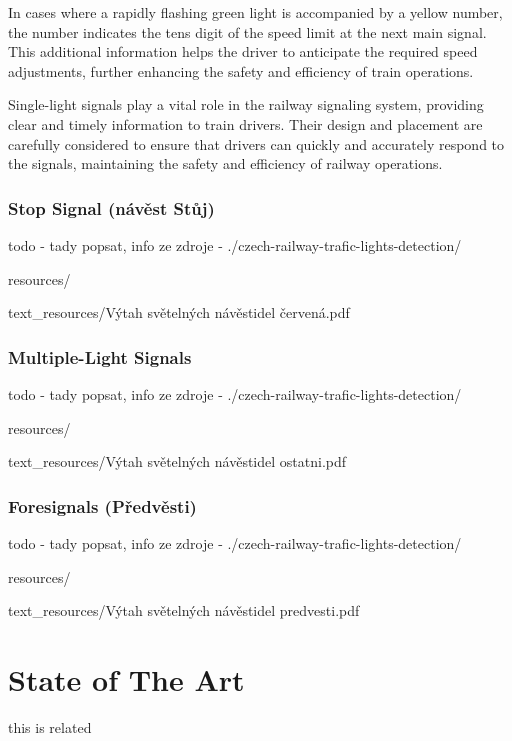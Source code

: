\documentclass[english, ing, kiv, he, iso690alph, pdf, viewonly]{fasthesis}
\begin{document}
In cases where a rapidly flashing green light is accompanied by a yellow number, the number indicates the tens digit of the speed limit at the next main signal. This additional information helps the driver to anticipate the required speed adjustments, further enhancing the safety and efficiency of train operations.

Single-light signals play a vital role in the railway signaling system, providing clear and timely information to train drivers. Their design and placement are carefully considered to ensure that drivers can quickly and accurately respond to the signals, maintaining the safety and efficiency of railway operations.






\newpage
\subsection{Stop Signal (návěst Stůj)}

todo - tady popsat, info ze zdroje - ./czech-railway-trafic-lights-detection/

resources/

text\_resources/Výtah světelných návěstidel červená.pdf 




\newpage
\subsection{Multiple-Light Signals}
todo - tady popsat, info ze zdroje - ./czech-railway-trafic-lights-detection/

resources/

text\_resources/Výtah světelných návěstidel ostatni.pdf 



\newpage
\subsection{Foresignals (Předvěsti)}
todo - tady popsat, info ze zdroje - ./czech-railway-trafic-lights-detection/

resources/

text\_resources/Výtah světelných návěstidel predvesti.pdf 



\chapter{State of The Art}
this is related\cite{Staino2022}
\end{document}
